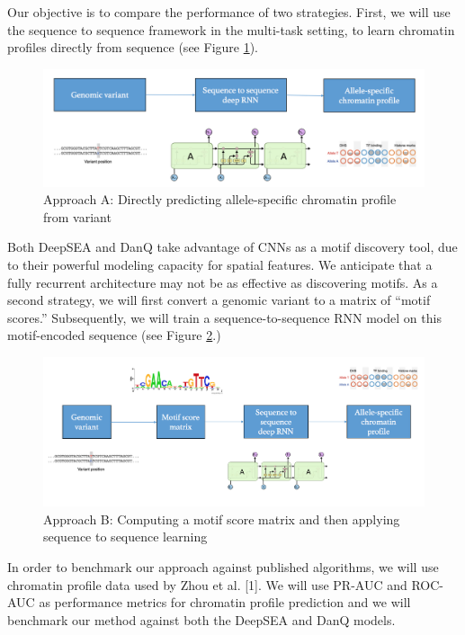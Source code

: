 \documentclass[twoside,11pt]{article}
\begin{document}
Our objective is to compare the performance of two strategies.  First, we will use the sequence to sequence framework in the multi-task setting, to learn chromatin profiles directly from sequence (see Figure \ref{fig:approach1}).

\begin{figure}[!htbp]
\centering
\includegraphics[width=\textwidth]{model1.png}
\caption{Approach A: Directly predicting allele-specific chromatin profile from variant}
\label{fig:approach1}
\end{figure}

Both DeepSEA and DanQ take advantage of CNNs as a motif discovery tool, due to their powerful modeling capacity for spatial features.  We anticipate that a fully recurrent architecture may not be as effective as discovering motifs.  As a second strategy, we will first convert a genomic variant to a matrix of ``motif scores.''  Subsequently, we will train a sequence-to-sequence RNN model on this motif-encoded sequence (see Figure \ref{fig:approach2}.)

\begin{figure}[!htbp]
\centering
\includegraphics[width=\textwidth]{model2.png}
\caption{Approach B: Computing a motif score matrix and then applying sequence to sequence learning}
\label{fig:approach2}
\end{figure}

In order to benchmark our approach against published algorithms, we will use chromatin profile data used by Zhou et al. [1].  We will use PR-AUC and ROC-AUC as performance metrics for chromatin profile prediction and we will benchmark our method against both the DeepSEA and DanQ models.
\end{document}
